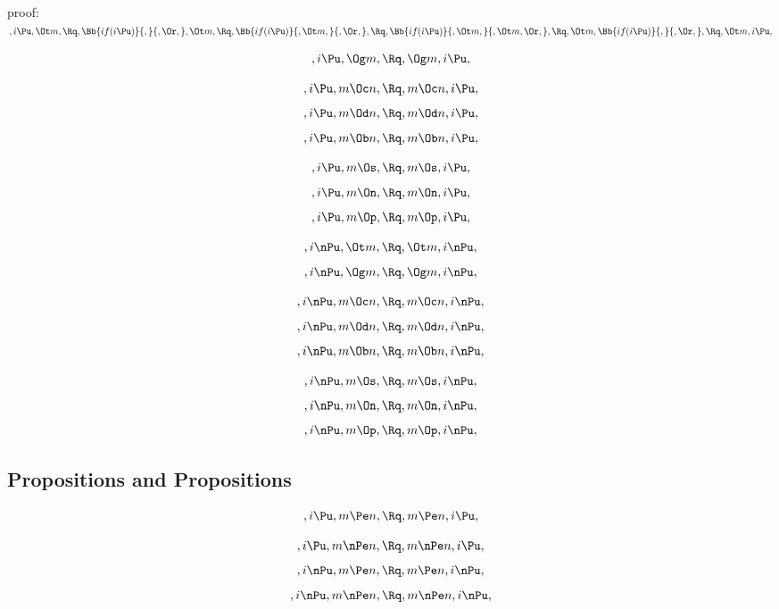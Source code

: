 \bigskip
\bigskip
\bigskip
\bigskip
proof:\\
\begin{math} 
, i \Pu, \Ot m,\\\\\\
\Rq, \Bb{if(i \Pu)}{,}{,\Or,}, \Ot m,\\\\\\
\Rq, \Bb{if(i \Pu)}{, \Ot m,}{,\Or,},\\\\\\
\Rq, \Bb{if(i \Pu)}{, \Ot m,}{, \Ot m,\Or,},\\\\\\
\Rq, \Ot m, \Bb{if(i \Pu)}{,}{,\Or,},\\\\\\
\Rq, \Ot m, i \Pu,
\end{math}



\[, i \Pu, \Og m, \Rq , \Og m, i \Pu,\]

\[, i \Pu, m \Oc n, \Rq , m \Oc n, i \Pu,\]
\[, i \Pu, m \Od n, \Rq , m \Od n, i \Pu,\]
\[, i \Pu, m \Ob n, \Rq , m \Ob n, i \Pu,\]

\[, i \Pu, m \Os, \Rq , m \Os, i \Pu,\]
\[, i \Pu, m \On, \Rq , m \On, i \Pu,\]
\[, i \Pu, m \Op, \Rq , m \Op, i \Pu,\]

\bigskip
\bigskip
\[, i \nPu, \Ot m, \Rq , \Ot m, i \nPu,\]
\[, i \nPu, \Og m, \Rq , \Og m, i \nPu,\]

\[, i \nPu, m \Oc n, \Rq , m \Oc n, i \nPu,\]
\[, i \nPu, m \Od n, \Rq , m \Od n, i \nPu,\]
\[, i \nPu, m \Ob n, \Rq , m \Ob n, i \nPu,\]

\[, i \nPu, m \Os, \Rq , m \Os, i \nPu,\]
\[, i \nPu, m \On, \Rq , m \On, i \nPu,\]
\[, i \nPu, m \Op, \Rq , m \Op, i \nPu,\]



\bigskip
\bigskip
\bigskip
\bigskip
\subsection{Propositions and Propositions}
\[,i \Pu, m \Pe n, \Rq , m \Pe n, i \Pu,\]



\[,i \Pu, m \nPe n, \Rq , m \nPe n, i \Pu,\]
\[,i \nPu, m \Pe n, \Rq , m \Pe n, i \nPu,\]
\[,i \nPu, m \nPe n, \Rq , m \nPe n, i \nPu,\]

